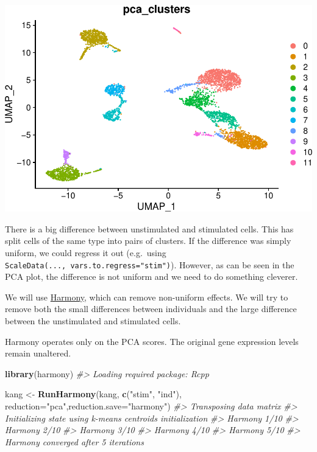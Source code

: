 \documentclass[
]{book}
\newenvironment{Shaded}{\begin{snugshade}}{\end{snugshade}}
\newcommand{\AttributeTok}[1]{\textcolor[rgb]{0.13,0.29,0.53}{#1}}
\newcommand{\CommentTok}[1]{\textcolor[rgb]{0.56,0.35,0.01}{\textit{#1}}}
\newcommand{\FunctionTok}[1]{\textcolor[rgb]{0.13,0.29,0.53}{\textbf{#1}}}
\newcommand{\NormalTok}[1]{#1}
\newcommand{\OtherTok}[1]{\textcolor[rgb]{0.56,0.35,0.01}{#1}}
\newcommand{\StringTok}[1]{\textcolor[rgb]{0.31,0.60,0.02}{#1}}
\begin{document}
\includegraphics{scRNAseqInR_Doco_files/figure-latex/unnamed-chunk-67-3.pdf}

There is a big difference between unstimulated and stimulated cells. This has split cells of the same type into pairs of clusters. If the difference was simply uniform, we could regress it out (e.g.~using \texttt{ScaleData(...,\ vars.to.regress="stim")}). However, as can be seen in the PCA plot, the difference is not uniform and we need to do something cleverer.

We will use \href{https://github.com/immunogenomics/harmony}{Harmony}, which can remove non-uniform effects. We will try to remove both the small differences between individuals and the large difference between the unstimulated and stimulated cells.

Harmony operates only on the PCA scores. The original gene expression levels remain unaltered.

\begin{Shaded}
\begin{Highlighting}[]
\FunctionTok{library}\NormalTok{(harmony)}
\CommentTok{\#\textgreater{} Loading required package: Rcpp}

\NormalTok{kang }\OtherTok{\textless{}{-}} \FunctionTok{RunHarmony}\NormalTok{(kang, }\FunctionTok{c}\NormalTok{(}\StringTok{"stim"}\NormalTok{, }\StringTok{"ind"}\NormalTok{), }\AttributeTok{reduction=}\StringTok{"pca"}\NormalTok{,}\AttributeTok{reduction.save=}\StringTok{"harmony"}\NormalTok{)}
\CommentTok{\#\textgreater{} Transposing data matrix}
\CommentTok{\#\textgreater{} Initializing state using k{-}means centroids initialization}
\CommentTok{\#\textgreater{} Harmony 1/10}
\CommentTok{\#\textgreater{} Harmony 2/10}
\CommentTok{\#\textgreater{} Harmony 3/10}
\CommentTok{\#\textgreater{} Harmony 4/10}
\CommentTok{\#\textgreater{} Harmony 5/10}
\CommentTok{\#\textgreater{} Harmony converged after 5 iterations}
\end{Highlighting}
\end{Shaded}
\end{document}
